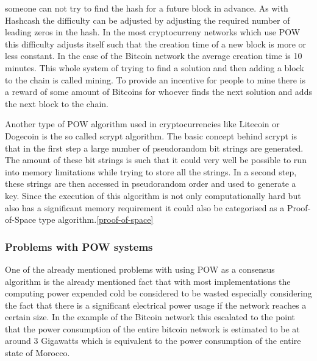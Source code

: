 someone can not try to find the hash for a future block in advance. As with Hashcash the difficulty can be adjusted by adjusting the required number
of leading zeros in the hash. In the most cryptocurreny networks which use POW this difficulty adjusts itself such that the creation time of a new block is more or less constant. In the case
of the Bitcoin network the average creation time is 10 minutes.
This whole system of trying to find a solution and then adding a block to the chain is called mining. To provide an incentive for
people to mine there is a reward of some amount of Bitcoins for whoever finds the next solution and adds the next block to the chain.\cite{url:bitcoin}\par
Another type of POW algorithm used in cryptocurrencies like Litecoin or Dogecoin is the so called scrypt algorithm.\cite{url:litecoin_dogecoin} The basic concept behind scrypt is that in the first 
step a large number of pseudorandom bit strings are generated. The amount of these bit strings is such that it could very well be possible to run into memory limitations while trying to store 
all the strings. In a second step, these strings are then accessed in pseudorandom order and used to generate a key. Since the execution of this algorithm is not only computationally hard but
also has a significant memory requirement it could also be categorised as a Proof-of-Space type algorithm.\cite{url:scrypt}\ref{proof-of-space}

\subsubsection{Problems with POW systems}

One of the already mentioned problems with using POW as a consensus algorithm is the already mentioned fact that with most implementations the computing power expended cold be considered
to be wasted especially considering the fact that there is a significant electrical power usage if the network reaches a certain size. In the example of the Bitcoin network this escalated to
the point that the power consumption of the entire bitcoin network is estimated to be at around 3 Gigawatts which is equivalent to the power consumption of the entire state of Morocco.\cite{url:btc_power}

